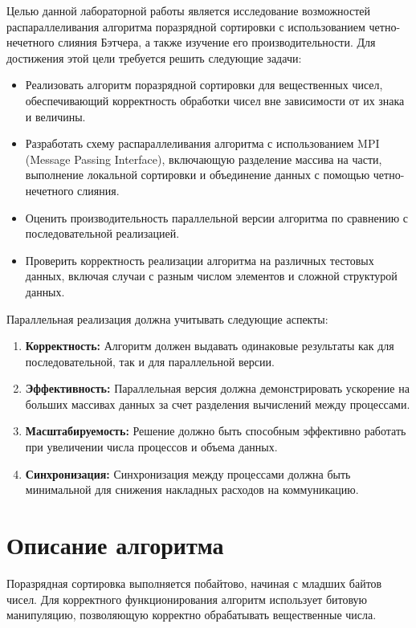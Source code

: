 \documentclass[12pt]{article}
\begin{document}
Целью данной лабораторной работы является исследование возможностей распараллеливания алгоритма поразрядной сортировки с использованием четно-нечетного слияния Бэтчера, а также изучение его производительности. Для достижения этой цели требуется решить следующие задачи:
\begin{itemize}
    \item Реализовать алгоритм поразрядной сортировки для вещественных чисел, обеспечивающий корректность обработки чисел вне зависимости от их знака и величины.
    \item Разработать схему распараллеливания алгоритма с использованием MPI (Message Passing Interface), включающую разделение массива на части, выполнение локальной сортировки и объединение данных с помощью четно-нечетного слияния.
    \item Оценить производительность параллельной версии алгоритма по сравнению с последовательной реализацией.
    \item Проверить корректность реализации алгоритма на различных тестовых данных, включая случаи с разным числом элементов и сложной структурой данных.
\end{itemize}

Параллельная реализация должна учитывать следующие аспекты:
\begin{enumerate}
    \item \textbf{Корректность:} Алгоритм должен выдавать одинаковые результаты как для последовательной, так и для параллельной версии.
    \item \textbf{Эффективность:} Параллельная версия должна демонстрировать ускорение на больших массивах данных за счет разделения вычислений между процессами.
    \item \textbf{Масштабируемость:} Решение должно быть способным эффективно работать при увеличении числа процессов и объема данных.
    \item \textbf{Синхронизация:} Синхронизация между процессами должна быть минимальной для снижения накладных расходов на коммуникацию.
\end{enumerate}

\newpage
\section*{Описание алгоритма}

Поразрядная сортировка выполняется побайтово, начиная с младших байтов чисел. Для корректного функционирования алгоритм использует битовую манипуляцию, позволяющую корректно обрабатывать вещественные числа. 
\end{document}
